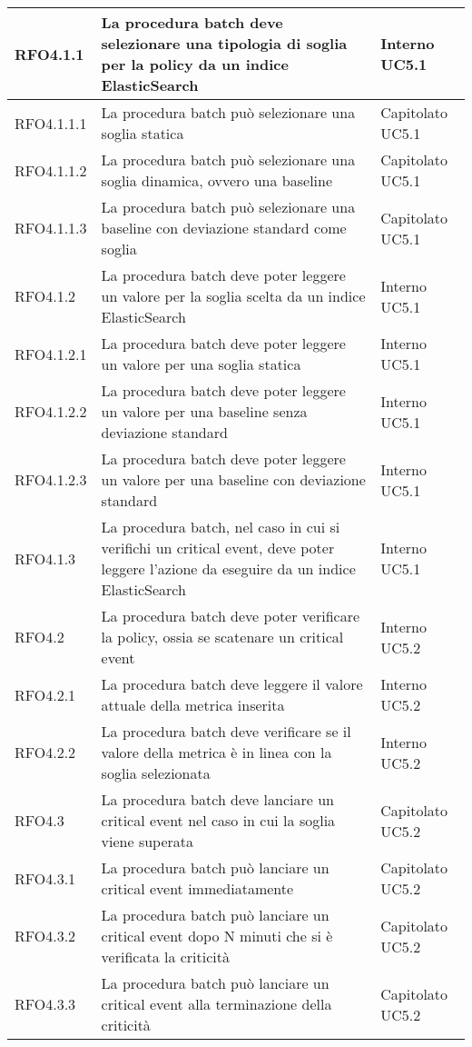 \begin{center}
\begin{longtable}{ | >{\centering\arraybackslash}m{2.5cm} | >{\centering\arraybackslash}m{8cm} | >{\centering\arraybackslash}m{2.5cm} | }
       	RFO4.1.1 & La procedura batch deve selezionare una tipologia di soglia per la policy da un indice ElasticSearch & Interno UC5.1\\ \hline
       	RFO4.1.1.1 & La procedura batch può selezionare una soglia statica & Capitolato UC5.1\\ \hline
       	RFO4.1.1.2 & La procedura batch può selezionare una soglia dinamica, ovvero una baseline & Capitolato UC5.1\\ \hline
       	RFO4.1.1.3 & La procedura batch può selezionare una baseline con deviazione standard come soglia & Capitolato UC5.1\\ \hline
       	RFO4.1.2 & La procedura batch deve poter leggere un valore per la soglia scelta da un indice ElasticSearch & Interno UC5.1\\ \hline
       	RFO4.1.2.1 & La procedura batch deve poter leggere un valore per una soglia statica & Interno UC5.1\\ \hline
       	RFO4.1.2.2 & La procedura batch deve poter leggere un valore per una baseline senza deviazione standard & Interno UC5.1\\ \hline
       	RFO4.1.2.3 & La procedura batch deve poter leggere un valore per una baseline con deviazione standard & Interno UC5.1\\ \hline
       	RFO4.1.3 & La procedura batch, nel caso in cui si verifichi un critical event, deve poter leggere l'azione da eseguire da un indice ElasticSearch & Interno UC5.1\\ \hline
       	RFO4.2 & La procedura batch deve poter verificare la policy, ossia se scatenare un critical event & Interno UC5.2\\ \hline
       	RFO4.2.1 & La procedura batch deve leggere il valore attuale della metrica inserita & Interno UC5.2\\ \hline
       	RFO4.2.2 & La procedura batch deve verificare se il valore della metrica è in linea con la soglia selezionata & Interno UC5.2\\ \hline
       	RFO4.3 & La procedura batch deve lanciare un critical event nel caso in cui la soglia viene superata & Capitolato UC5.2\\ \hline
       	RFO4.3.1 & La procedura batch può lanciare un critical event immediatamente & Capitolato UC5.2\\ \hline
       	RFO4.3.2 & La procedura batch può lanciare un critical event dopo N minuti che si è verificata la criticità & Capitolato UC5.2\\ \hline
       	RFO4.3.3 & La procedura batch può lanciare un critical event alla terminazione della criticità & Capitolato UC5.2\\ \hline

\end{longtable}
\end{center}
